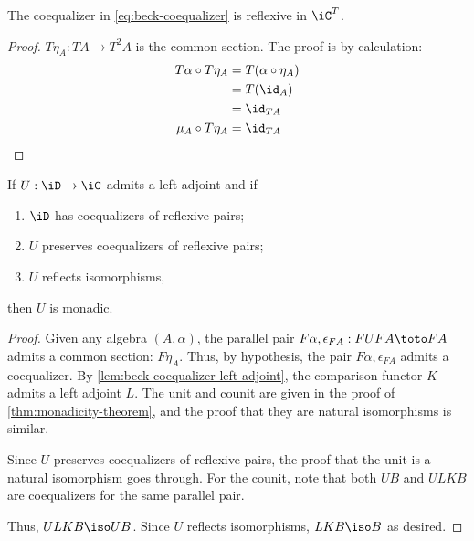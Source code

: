 \documentclass{amsart}
\begin{document}
\begin{lem}\label{lem:common-section}
  The coequalizer in \eqref{eq:beck-coequalizer} is reflexive in $\iC^{T}$.
\end{lem}
\begin{proof}
  $T\eta_{A} : TA \to T^{2}A$ is the common section.
  The proof is by calculation:
  \begin{align}
    T\alpha \circ T\eta_{A} &= T(\alpha \circ \eta_{A})\\
                &= T(\id_{A})\\
                &= \id_{TA}\\
    \mu_{A} \circ T\eta_{A} &= \id_{TA}
  \end{align}
\end{proof}

\begin{thm}
  If $U : \iD \to \iC$ admits a left adjoint and if
  \begin{enumerate}
  \item $\iD$ has coequalizers of reflexive pairs;
  \item $U$ preserves coequalizers of reflexive pairs;
  \item $U$ reflects isomorphisms,
  \end{enumerate}
  then $U$ is monadic.
\end{thm}
\begin{proof}
  Given any algebra $(A, \alpha)$, the parallel pair $F\alpha, \epsilon_{FA} : FUFA \toto FA$ admits a common section: $F\eta_{A}$.
  Thus, by hypothesis, the pair $F\alpha,\epsilon_{FA}$ admits a coequalizer.
  By \cref{lem:beck-coequalizer-left-adjoint}, the comparison functor $K$ admits a left adjoint $L$.
  The unit and counit are given in the proof of \cref{thm:monadicity-theorem}, and the proof that they are natural isomorphisms is similar.

  Since $U$ preserves coequalizers of reflexive pairs, the proof that the unit is a natural isomorphism goes through.
  For the counit, note that both $UB$ and $ULKB$ are coequalizers for the same parallel pair.
  
  Thus, $ULKB \iso UB$.
  Since $U$ reflects isomorphisms, $LKB \iso B$ as desired.
\end{proof}



\end{document}

